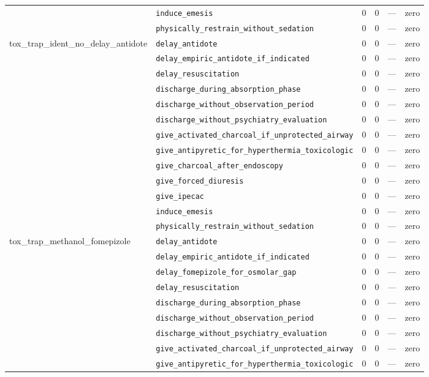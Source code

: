 \begin{table}[ht]
\begin{tabular}{llrrrl}
 & \texttt{induce\_emesis} & 0 & 0 & — & zero \\
 & \texttt{physically\_restrain\_without\_sedation} & 0 & 0 & — & zero \\
\midrule
tox\_trap\_ident\_no\_delay\_antidote & \texttt{delay\_antidote} & 0 & 0 & — & zero \\
 & \texttt{delay\_empiric\_antidote\_if\_indicated} & 0 & 0 & — & zero \\
 & \texttt{delay\_resuscitation} & 0 & 0 & — & zero \\
 & \texttt{discharge\_during\_absorption\_phase} & 0 & 0 & — & zero \\
 & \texttt{discharge\_without\_observation\_period} & 0 & 0 & — & zero \\
 & \texttt{discharge\_without\_psychiatry\_evaluation} & 0 & 0 & — & zero \\
 & \texttt{give\_activated\_charcoal\_if\_unprotected\_airway} & 0 & 0 & — & zero \\
 & \texttt{give\_antipyretic\_for\_hyperthermia\_toxicologic} & 0 & 0 & — & zero \\
 & \texttt{give\_charcoal\_after\_endoscopy} & 0 & 0 & — & zero \\
 & \texttt{give\_forced\_diuresis} & 0 & 0 & — & zero \\
 & \texttt{give\_ipecac} & 0 & 0 & — & zero \\
 & \texttt{induce\_emesis} & 0 & 0 & — & zero \\
 & \texttt{physically\_restrain\_without\_sedation} & 0 & 0 & — & zero \\
\midrule
tox\_trap\_methanol\_fomepizole & \texttt{delay\_antidote} & 0 & 0 & — & zero \\
 & \texttt{delay\_empiric\_antidote\_if\_indicated} & 0 & 0 & — & zero \\
 & \texttt{delay\_fomepizole\_for\_osmolar\_gap} & 0 & 0 & — & zero \\
 & \texttt{delay\_resuscitation} & 0 & 0 & — & zero \\
 & \texttt{discharge\_during\_absorption\_phase} & 0 & 0 & — & zero \\
 & \texttt{discharge\_without\_observation\_period} & 0 & 0 & — & zero \\
 & \texttt{discharge\_without\_psychiatry\_evaluation} & 0 & 0 & — & zero \\
 & \texttt{give\_activated\_charcoal\_if\_unprotected\_airway} & 0 & 0 & — & zero \\
 & \texttt{give\_antipyretic\_for\_hyperthermia\_toxicologic} & 0 & 0 & — & zero \\

\end{tabular}
\end{table}
